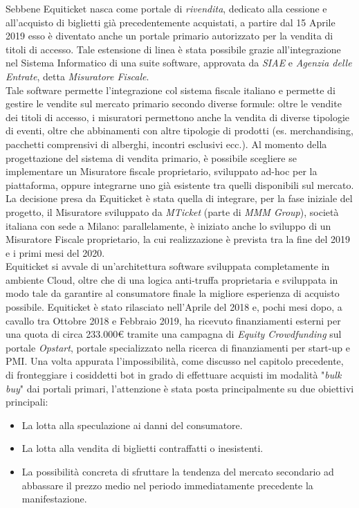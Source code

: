 Sebbene Equiticket nasca come portale di \textit{rivendita}, dedicato alla cessione e all'acquisto di biglietti già precedentemente acquistati, a partire dal 15 Aprile 2019 esso è diventato anche un portale primario autorizzato per la vendita di titoli di accesso. 
Tale estensione di linea è stata possibile grazie all'integrazione nel Sistema Informatico di una suite software, approvata da \textit{SIAE} e \textit{Agenzia delle Entrate}, detta \emph{Misuratore Fiscale}. \\
Tale software permette l'integrazione col sistema fiscale italiano e permette di gestire le vendite sul mercato primario secondo diverse formule: oltre le vendite dei titoli di accesso, i misuratori permettono anche la vendita di diverse tipologie di eventi, oltre che abbinamenti con altre tipologie di prodotti (es. merchandising, pacchetti comprensivi di alberghi, incontri esclusivi ecc.).
Al momento della progettazione del sistema di vendita primario, è possibile scegliere se implementare un Misuratore fiscale proprietario, sviluppato ad-hoc per la piattaforma, oppure integrarne uno già esistente tra quelli disponibili sul mercato. 
La decisione presa da Equiticket è stata quella di integrare, per la fase iniziale del progetto, il Misuratore sviluppato da \textit{MTicket} (parte di \textit{MMM Group}), società italiana con sede a Milano: parallelamente, è iniziato anche lo sviluppo di un Misuratore Fiscale proprietario, la cui realizzazione è prevista tra la fine del 2019 e i primi mesi del 2020. 
\\
Equiticket si avvale di un'architettura software sviluppata completamente in ambiente Cloud, oltre che di una logica anti-truffa proprietaria e sviluppata in modo tale da garantire al consumatore finale la migliore esperienza di acquisto possibile. 
Equiticket è stato rilasciato nell'Aprile del 2018 e, pochi mesi dopo, a cavallo tra Ottobre 2018 e Febbraio 2019, ha ricevuto finanziamenti esterni per una quota di circa 233.000€ tramite una campagna di \textit{\emph{Equity Crowdfunding}} sul portale \textit{\emph{Opstart}}, portale specializzato nella ricerca di finanziamenti per start-up e PMI.
Una volta appurata l'impossibilità, come discusso nel capitolo precedente, di fronteggiare i cosiddetti bot in grado di effettuare acquisti im modalità "\emph{bulk buy}" dai portali primari, l'attenzione è stata posta principalmente su due obiettivi principali: 
\begin{itemize}
\item La lotta alla speculazione ai danni del consumatore.
\item La lotta alla vendita di biglietti contraffatti o inesistenti. 
\item La possibilità concreta di sfruttare la tendenza del mercato secondario ad abbassare il prezzo medio nel periodo immediatamente precedente la manifestazione.
\end{itemize}
